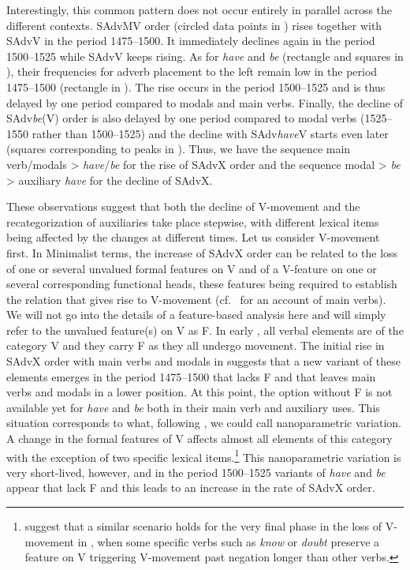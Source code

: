 \documentclass[output=paper]{langsci/langscibook}
\begin{document}
Interestingly, this common pattern does not occur entirely in parallel across
the different contexts. SAdvMV order (circled data points in
) rises together with SAdvV in the period 1475--1500. It
immediately declines again in the period 1500--1525 while SAdvV keeps rising. As
for \emph{have} and \emph{be} (rectangle and squares in
), their frequencies for adverb placement to the left remain
low in the period 1475--1500 (rectangle in ). The rise occurs
in the period 1500--1525 and is thus delayed by one period compared to modals
and main verbs. Finally, the decline of SAdv\emph{be}(V) order is also
delayed by one period compared to modal verbs (1525--1550 rather than 1500--1525)
and the decline with SAdv\emph{have}V starts even later (squares
corresponding to peaks in ). Thus, we have the sequence main
verb/modals > \emph{have}/\emph{be} for the rise of SAdvX order and the
sequence modal > \emph{be} > auxiliary \emph{have} for the decline of
SAdvX.\largerpage[-1]

These observations suggest that both the decline of V-movement and the
recategorization of auxiliaries take place stepwise, with different lexical
items being affected by the changes at different times. Let us consider
V-movement first. In Minimalist terms, the increase of SAdvX order can be
related to the loss of one or several unvalued formal features on V and of a
V-feature on one or several corresponding functional heads, these features
being required to establish the  relation that gives rise to V-movement
(cf.\ \citealt[528ff.]{HaeIhs2016} for an account of main verbs). We will not go
into the details of a feature-based analysis here and will simply refer to the
unvalued feature(s) on V as F. In early , all verbal elements are of the
category V and they carry F as they all undergo movement.  The initial rise in
SAdvX order with main verbs and modals in  suggests that a
new variant of these elements emerges in the period 1475--1500 that lacks F and
that leaves main verbs and modals in a lower position. At this point, the
option without F is not available yet for \emph{have} and \emph{be} both in
their main verb and auxiliary uses. This situation corresponds to what,
following \textcite{BibRob2012b,BibRob2016}, we could call nanoparametric
variation. A change in the formal features of V affects almost all elements of
this category with the exception of two specific lexical
items.\footnote{\citet{BibRob2012b} suggest that a similar scenario holds for
the very final phase in the loss of V-movement in , when some specific
verbs such as \emph{know} or \emph{doubt} preserve a feature on V triggering
V-movement past negation longer than other verbs.} This nanoparametric
variation is very short-lived, however, and in the period 1500--1525 variants
of \emph{have} and \emph{be} appear that lack F and this leads to an increase
in the rate of SAdvX order.
\end{document}
